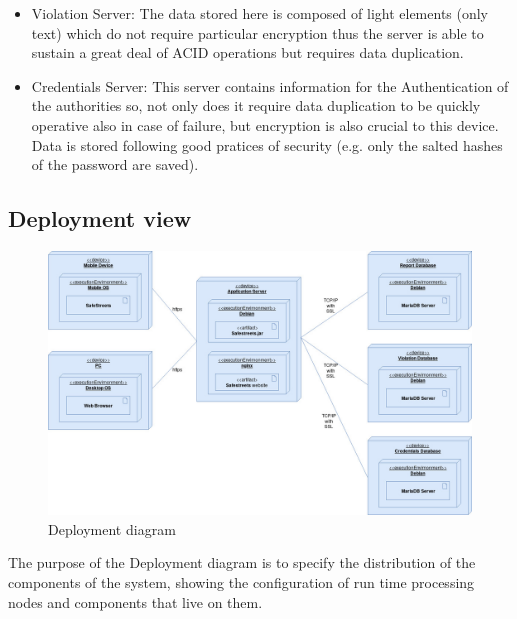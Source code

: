\begin{itemize}
\begin{itemize}
            \item Violation Server: The data stored here is composed of light elements (only text) which do not require particular encryption thus the server 
                is able to sustain a great deal of ACID operations but requires data duplication.

            \item Credentials Server: This server contains information for the Authentication of the authorities so, not only does it require data duplication
                to be quickly operative also in case of failure, but encryption is also crucial to this device. Data is stored following good pratices of 
                security (e.g. only the salted hashes of the password are saved).     

        \end{itemize}
        
    \end{itemize}

\newpage



\subsection{Deployment view}

    \begin{figure}[H]

        \includegraphics[width=\textwidth]{Images/deployment.jpg}
        \caption{\label{fig:deployment}Deployment diagram}
        
    \end{figure}
	
	The purpose of the Deployment diagram is to specify the distribution of the components of the system, showing the configuration of run time processing nodes and components that live on them. 

